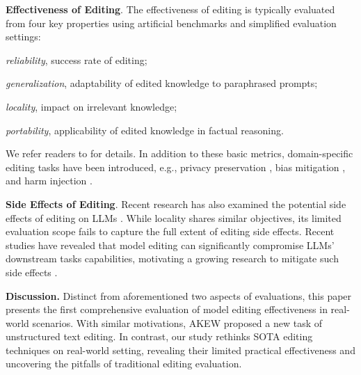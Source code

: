 \noindent\textbf{Effectiveness of Editing}.
The effectiveness of editing is typically evaluated from four key properties using artificial benchmarks and simplified evaluation settings:
\begin{enumerate*}[label=\roman*)]
    \item \textit{reliability}, success rate of editing; 
    \item \textit{generalization}, adaptability of edited knowledge to paraphrased prompts;
    \item \textit{locality}, impact on irrelevant knowledge;
    \item \textit{portability}, applicability of edited knowledge in factual reasoning.
\end{enumerate*}
We refer readers to \citet{yao-etal-2023-editing} for details.
In addition to these basic metrics, domain-specific editing tasks have been introduced, e.g., privacy preservation \cite{wu-etal-2023-depn}, bias mitigation \cite{chen2024bias}, and harm injection \cite{chen2024harm}.


\noindent\textbf{Side Effects of Editing}.
Recent research has also examined the potential side effects of editing on LLMs \cite{hoelscher-obermaier-etal-2023-detecting, li2024unveiling}.
While locality shares similar objectives, its limited evaluation scope fails to capture the full extent of editing side effects.
Recent studies \citep{yang-etal-2024-butterfly, gu-etal-2024-model, gupta-etal-2024-model} have revealed that model editing can significantly compromise LLMs' downstream tasks capabilities, motivating a growing research to mitigate such side effects \cite{corr24prune, fang2024alphaedit}.

\noindent\textbf{Discussion.} 
Distinct from aforementioned two aspects of evaluations, %
this paper presents the first comprehensive evaluation of model editing effectiveness in real-world scenarios.
With similar motivations, AKEW \cite{wu-etal-2024-akew} proposed a new task of unstructured text editing. %
In contrast, our study rethinks SOTA editing techniques on real-world setting, revealing their limited practical effectiveness and uncovering the pitfalls of traditional editing evaluation.








